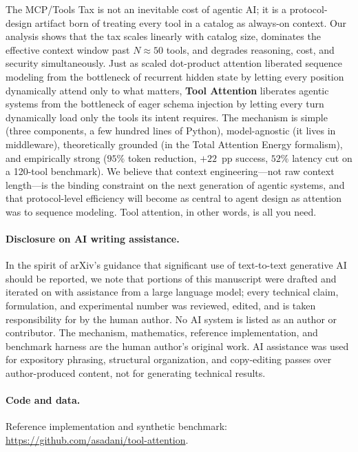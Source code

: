 \documentclass[11pt]{article}
\begin{document}
The MCP/Tools Tax is not an inevitable cost of agentic AI; it is a protocol-design artifact born of treating every tool in a catalog as always-on context. Our analysis shows that the tax scales linearly with catalog size, dominates the effective context window past $N \approx 50$ tools, and degrades reasoning, cost, and security simultaneously. Just as scaled dot-product attention liberated sequence modeling from the bottleneck of recurrent hidden state by letting every position dynamically attend only to what matters, \textbf{Tool Attention} liberates agentic systems from the bottleneck of eager schema injection by letting every turn dynamically load only the tools its intent requires. The mechanism is simple (three components, a few hundred lines of Python), model-agnostic (it lives in middleware), theoretically grounded (in the Total Attention Energy formalism), and empirically strong ($95\%$ token reduction, $+22$~pp success, $52\%$ latency cut on a 120-tool benchmark). We believe that context engineering---not raw context length---is the binding constraint on the next generation of agentic systems, and that protocol-level efficiency will become as central to agent design as attention was to sequence modeling. Tool attention, in other words, is all you need.

\paragraph{Disclosure on AI writing assistance.} In the spirit of arXiv's guidance that significant use of text-to-text generative AI should be reported, we note that portions of this manuscript were drafted and iterated on with assistance from a large language model; every technical claim, formulation, and experimental number was reviewed, edited, and is taken responsibility for by the human author. No AI system is listed as an author or contributor. The mechanism, mathematics, reference implementation, and benchmark harness are the human author's original work. AI assistance was used for expository phrasing, structural organization, and copy-editing passes over author-produced content, not for generating technical results.

\paragraph{Code and data.} Reference implementation and synthetic benchmark:
\url{https://github.com/asadani/tool-attention}.
\end{document}
